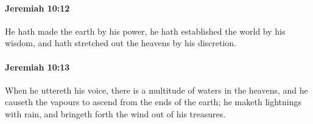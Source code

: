 		\paragraph{Jeremiah 10:12} %
			\label{JEREMIAH-10-12}

			He hath made the earth by his power, he hath established the world by his wisdom, and hath stretched out the heavens by his discretion.


		\paragraph{Jeremiah 10:13} %
			\label{JEREMIAH-10-13}

			When he uttereth his voice, there is a multitude of waters in the heavens, and he causeth the vapours to ascend from the ends of the earth; he maketh lightnings with rain, and bringeth forth the wind out of his treasures.


